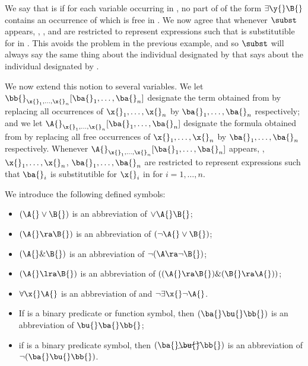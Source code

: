 We say that \ba{} is  \x{}  \A{} if for each variable \y{} occurring in \ba{}, no part of \A{} of the form $\exists \y{} \B{}$ contains an occurrence of \x{} which is free in \A{}.
We now agree that whenever $\subst$ appears, \A{}, \x{}, and \ba{} are restricted to represent expressions such that \ba{} is substitutible for \ba{} in \A{}.
This avoids the problem in the previous example, and so $\subst$ will always say the same thing about the individual designated by \ba{} that \A{} says about the individual designated by \x{}.

We now extend this notion to several variables.
We let $\bb{}_{\x{}_1, \dots, \x{}_n} [\ba{}_1, \dots, \ba{}_n]$ designate the term obtained from \bb{} by replacing all occurrences of $\x{}_1, \dots, \x{}_n$ by $\ba{}_1, \dots, \ba{}_n$ respectively;
and we let $\A{}_{\x{}_1, \dots, \x{}_n} [\ba{}_1, \dots, \ba{}_n]$ designate the formula obtained from \A{} by replacing all free occurrences of $\x{}_1, \dots, \x{}_n$ by $\ba{}_1, \dots, \ba{}_n$ respectively.
Whenever $\A{}_{\x{}_1, \dots, \x{}_n} [\ba{}_1, \dots, \ba{}_n]$ appears, \A{}, $\x{}_1, \dots, \x{}_n$, $\ba{}_1, \dots, \ba{}_n$ are restricted to represent expressions such that $\ba{}_i$ is substitutible for $\x{}_i$ in \A{} for $i = 1, \dots, n$.


We introduce the following defined symbols:
\begin{itemize}
    \item $(\A{} \vee \B{})$ is an abbreviation of $\vee \A{} \B{}$;
    \item $(\A{} \ra \B{})$ is an abbreviation of $(\neg \A{} \vee \B{})$;
    \item $(\A{} \& \B{})$ is an abbreviation of $\neg (\A \ra \neg \B{})$;
    \item $(\A{} \lra \B{})$ is an abbreviation of $((\A{} \ra \B{}) \& (\B{} \ra \A{}))$;
    \item $\forall \x{} \A{}$ is an abbreviation of and $\neg \exists \x{} \neg \A{}$.
    \item If \bu{} is a binary predicate or function symbol, then $(\ba{} \bu{} \bb{})$ is an abbreviation of $\bu{} \ba{} \bb{}$;
    \item if \bu{} is a binary predicate symbol, then $(\ba{} \cancel{\bu{}} \bb{})$ is an abbreviation of $\neg (\ba{} \bu{} \bb{})$.
\end{itemize}

